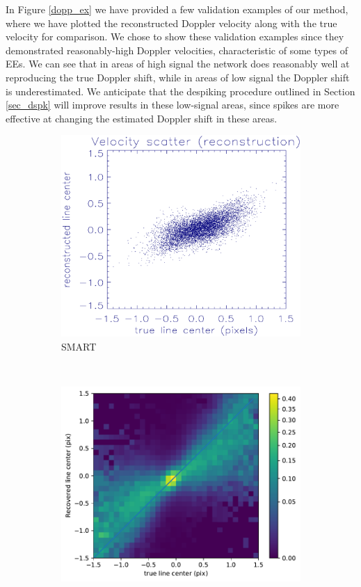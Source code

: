 \documentclass[10pt,letterpaper]{article}
\newcommand{\EEs}{\acp{EE}}
\begin{document}
			In Figure \ref{dopp_ex} we have provided a few validation examples of our method, where we have plotted the reconstructed Doppler velocity along with the true velocity for comparison. 
			We chose to show these validation examples since they demonstrated reasonably-high Doppler velocities, characteristic of some types of \EEs.
			We can see that in areas of high signal the network does reasonably well at reproducing the true Doppler shift, while in areas of low signal the Doppler shift is underestimated.
			We anticipate that the despiking procedure outlined in Section \ref{sec_dspk} will improve results in these low-signal areas, since spikes are more effective at changing the estimated Doppler shift in these areas.
			
			\begin{figure}[t!]
				\centering
				\begin{subfigure}[t]{0.45\textwidth}
					\centering
					\includegraphics[width=\textwidth]{fig/smart_hist}
					\caption{SMART}
					\label{smart_hist}
				\end{subfigure}%
				~ 
				\begin{subfigure}[t]{0.45\textwidth}
					\centering	
					\includegraphics[width=\textwidth]{fig/linearity}

\end{subfigure}
\end{figure}
\end{document}
